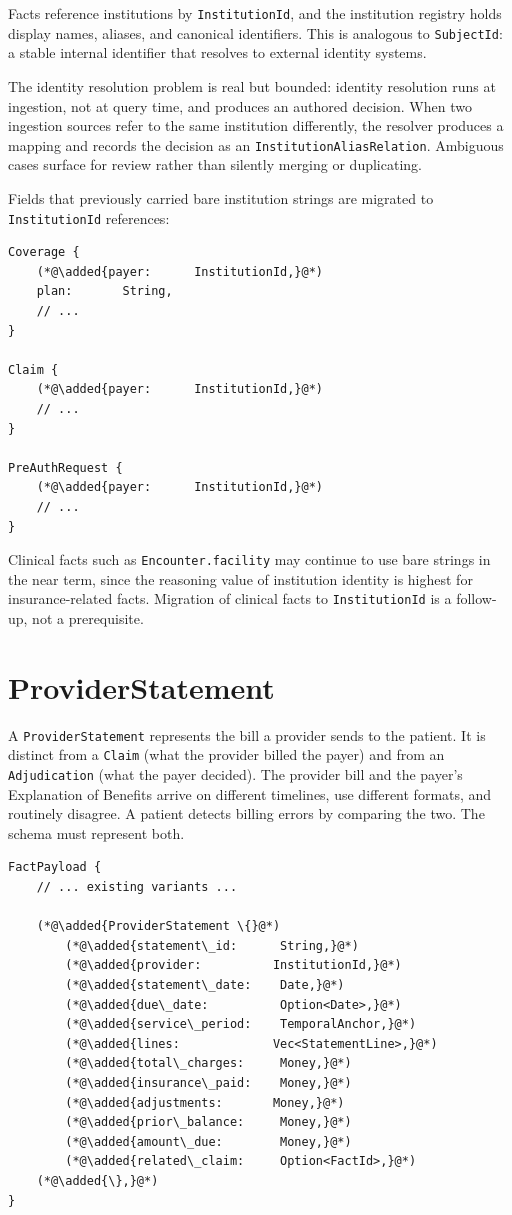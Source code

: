 \documentclass[11pt]{article}
\newcommand{\added}[1]{\textcolor{accentblue}{#1}}
\begin{document}
Facts reference institutions by \texttt{InstitutionId}, and the
institution registry holds display names, aliases, and canonical
identifiers. This is analogous to \texttt{SubjectId}: a stable internal
identifier that resolves to external identity systems.

The identity resolution problem is real but bounded: identity
resolution runs at ingestion, not at query time, and produces an
authored decision. When two ingestion sources refer to the same
institution differently, the resolver produces a mapping and records
the decision as an \texttt{InstitutionAliasRelation}. Ambiguous cases
surface for review rather than silently merging or duplicating.

Fields that previously carried bare institution strings are migrated to
\texttt{InstitutionId} references:

\begin{lstlisting}
Coverage {
    (*@\added{payer:      InstitutionId,}@*)
    plan:       String,
    // ...
}

Claim {
    (*@\added{payer:      InstitutionId,}@*)
    // ...
}

PreAuthRequest {
    (*@\added{payer:      InstitutionId,}@*)
    // ...
}
\end{lstlisting}

Clinical facts such as \texttt{Encounter.facility} may continue to use
bare strings in the near term, since the reasoning value of institution
identity is highest for insurance-related facts. Migration of clinical
facts to \texttt{InstitutionId} is a follow-up, not a prerequisite.

\section{ProviderStatement}
\label{sec:provider-statement}

A \texttt{ProviderStatement} represents the bill a provider sends to the
patient. It is distinct from a \texttt{Claim} (what the provider billed the
payer) and from an \texttt{Adjudication} (what the payer decided). The
provider bill and the payer's Explanation of Benefits arrive on different
timelines, use different formats, and routinely disagree. A patient
detects billing errors by comparing the two. The schema must represent
both.

\begin{lstlisting}
FactPayload {
    // ... existing variants ...

    (*@\added{ProviderStatement \{}@*)
        (*@\added{statement\_id:      String,}@*)
        (*@\added{provider:          InstitutionId,}@*)
        (*@\added{statement\_date:    Date,}@*)
        (*@\added{due\_date:          Option<Date>,}@*)
        (*@\added{service\_period:    TemporalAnchor,}@*)
        (*@\added{lines:             Vec<StatementLine>,}@*)
        (*@\added{total\_charges:     Money,}@*)
        (*@\added{insurance\_paid:    Money,}@*)
        (*@\added{adjustments:       Money,}@*)
        (*@\added{prior\_balance:     Money,}@*)
        (*@\added{amount\_due:        Money,}@*)
        (*@\added{related\_claim:     Option<FactId>,}@*)
    (*@\added{\},}@*)
}
\end{lstlisting}
\end{document}

